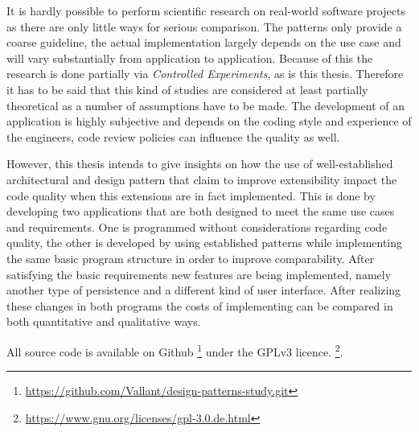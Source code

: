 It is hardly possible to perform scientific research on real-world software projects as there are only little ways for serious comparison. The patterns only provide a coarse guideline, the actual implementation largely depends on the use case and will vary substantially from application to application. Because of this the research is done partially via \emph{Controlled Experiments}, as is this thesis. Therefore it has to be said that this kind of studies are considered at least partially theoretical as a number of assumptions have to be made. The development of an application is highly subjective and depends on the coding style and experience of the engineers, code review policies can influence the quality as well.

However, this thesis intends to give insights on how the use of well-established architectural and design pattern that claim to improve extensibility impact the code quality when this extensions are in fact implemented. This is done by developing two applications that are both designed to meet the same use cases and requirements. One is programmed without considerations regarding code quality, the other is developed by using established patterns while implementing the same basic program structure in order to improve comparability.
After satisfying the basic requirements new features are being implemented, namely another type of persistence and a different kind of user interface. After realizing these changes in both programs the costs of implementing can be compared in both quantitative and qualitative ways. 

All source code is available on Github \footnote{\href{https://github.com/Vallant/design-patterns-study.git}{https://github.com/Vallant/design-patterns-study.git}} under the GPLv3 licence. \footnote{\href{https://www.gnu.org/licenses/gpl-3.0.de.html}{https://www.gnu.org/licenses/gpl-3.0.de.html}}.

